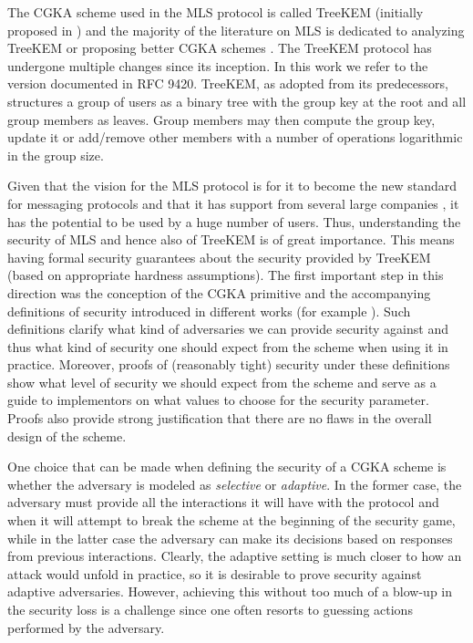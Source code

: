The CGKA scheme used in the MLS protocol is called TreeKEM (initially proposed in \cite{treekem}) and the majority of the literature on MLS is dedicated to analyzing TreeKEM or proposing better CGKA schemes \cite{ttkem,rtreekem,insider-security,modular-group-messaging,cocoa,decaf} . The TreeKEM protocol has undergone multiple changes since its inception. In this work we refer to the version documented in RFC 9420. TreeKEM, as adopted from its predecessors, structures a group of users as a binary tree with the group key at the root and all group members as leaves. Group members may then compute the group key, update it or add/remove other members with a number of operations logarithmic in the group size.

Given that the vision for the MLS protocol is for it to become the new standard for messaging protocols and that it has support from several large companies \cite{google-mls,mls-support}, it has the potential to be used by a huge number of users. Thus, understanding the security of MLS and hence also of TreeKEM is of great importance. This means having formal security guarantees about the security provided by TreeKEM (based on appropriate hardness assumptions). The first important step in this direction was the conception of the CGKA primitive and the accompanying definitions of security introduced in different works (for example \cite{rtreekem, ttkem}). Such definitions clarify what kind of adversaries we can provide security against and thus what kind of security one should expect from the scheme when using it in practice. Moreover, proofs of (reasonably tight) security under these definitions show what level of security we should expect from the scheme and serve as a guide to implementors on what values to choose for the security parameter. Proofs also provide strong justification that there are no flaws in the overall design of the scheme.

One choice that can be made when defining the security of a CGKA scheme is whether the adversary is modeled as \emph{selective} or \emph{adaptive}. In the former case, the adversary must provide all the interactions it will have with the protocol and when it will attempt to break the scheme at the beginning of the security game, while in the latter case the adversary can make its decisions based on responses from previous interactions. Clearly, the adaptive setting is much closer to how an attack would unfold in practice, so it is desirable to prove security against adaptive adversaries. However, achieving this without too much of a blow-up in the security loss is a challenge since one often resorts to guessing actions performed by the adversary.

